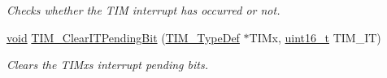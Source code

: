 \begin{DoxyCompactItemize}
\begin{DoxyCompactList}\small\item\em Checks whether the T\+IM interrupt has occurred or not. \end{DoxyCompactList}\item 
\hyperlink{usb__devapi_8h_afabf60e7f57651d6d595a02c75f07cd0}{void} \hyperlink{group___t_i_m___exported___functions_ga9eb1e95af71ed380f51a2c6d585cc5d6}{T\+I\+M\+\_\+\+Clear\+I\+T\+Pending\+Bit} (\hyperlink{struct_t_i_m___type_def}{T\+I\+M\+\_\+\+Type\+Def} $\ast$T\+I\+Mx, \hyperlink{_p_e___types_8h_a1f1825b69244eb3ad2c7165ddc99c956}{uint16\+\_\+t} T\+I\+M\+\_\+\+IT)
\begin{DoxyCompactList}\small\item\em Clears the T\+I\+Mx\textquotesingle{}s interrupt pending bits. \end{DoxyCompactList}\end{DoxyCompactItemize}
